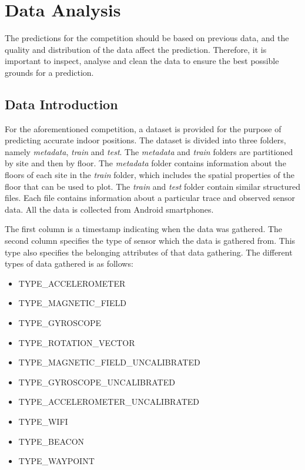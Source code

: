 \section{Data Analysis}\label{data}
The predictions for the competition should be based on previous data, and the quality and distribution of the data affect the prediction. Therefore, it is important to inspect, analyse and clean the data to ensure the best possible grounds for a prediction.

\subsection{Data Introduction}
For the aforementioned competition, a dataset is provided for the purpose of predicting accurate indoor positions. The dataset is divided into three folders, namely \textit{metadata}, \textit{train} and \textit{test}. The \textit{metadata} and \textit{train} folders are partitioned by site and then by floor. The \textit{metadata} folder contains information about the floors of each site in the \textit{train} folder, which includes the spatial properties of the floor that can be used to plot. The \textit{train} and \textit{test} folder contain similar structured files. Each file contains information about a particular trace and observed sensor data. All the data is collected from Android smartphones.\cite{KaggleData}

The first column is a timestamp indicating when the data was gathered. The second column specifies the type of sensor which the data is gathered from. This type also specifies the belonging attributes of that data gathering. The different types of data gathered is as follows\cite{KaggleDataGithub}:

\begin{itemize}
    \item TYPE\_ACCELEROMETER
    \item TYPE\_MAGNETIC\_FIELD
    \item TYPE\_GYROSCOPE
    \item TYPE\_ROTATION\_VECTOR
    \item TYPE\_MAGNETIC\_FIELD\_UNCALIBRATED
    \item TYPE\_GYROSCOPE\_UNCALIBRATED
    \item TYPE\_ACCELEROMETER\_UNCALIBRATED
    \item TYPE\_WIFI
    \item TYPE\_BEACON
    \item TYPE\_WAYPOINT
\end{itemize}

